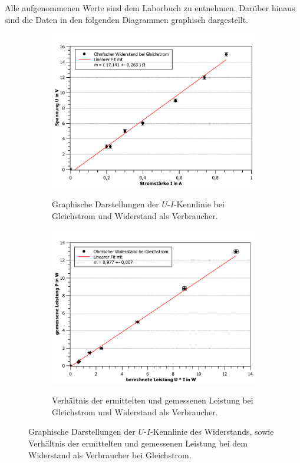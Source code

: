 Alle aufgenommenen Werte sind dem Laborbuch zu entnehmen. 
Darüber hinaus sind die Daten in den folgenden Diagrammen graphisch dargestellt.
\begin{figure}[ht]
	\label{fig:R_gleich}
	\centering	
	\begin{subfigure}{0.70\textwidth}
		\centering
		\includegraphics[width=\textwidth]{auswertung/widerstand_gleichstrom_Widerstand.pdf}
		\label{fig:1}
		\caption{Graphische Darstellungen der $U$-$I$-Kennlinie bei Gleichstrom und Widerstand als Verbraucher.}	
	\end{subfigure}
	\begin{subfigure}{0.70\textwidth}
		\centering
		\includegraphics[width=\textwidth]{auswertung/widerstand_gleichstrom_Leistung.pdf}
		\label{fig:2}
		\caption{Verhältnis der ermittelten und gemessenen Leistung bei Gleichstrom und Widerstand als Verbraucher.}	
	\end{subfigure}
	\caption{Graphische Darstellungen der $U$-$I$-Kennlinie des Widerstands, sowie Verhältnis der ermittelten und gemessenen Leistung bei dem Widerstand als Verbraucher bei Gleichstrom.}
\end{figure}
